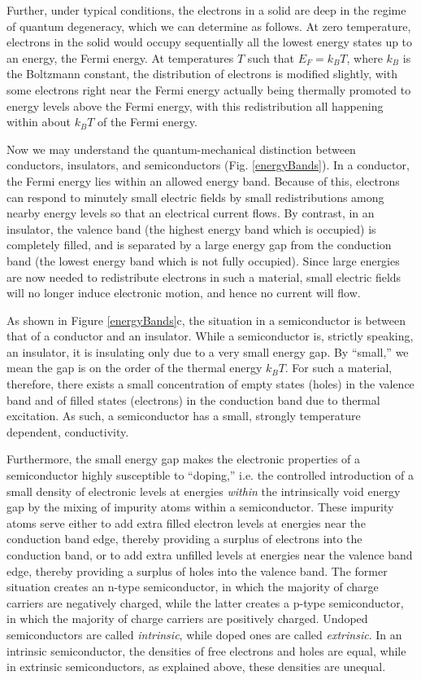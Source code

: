 \documentclass{../lab}
\begin{document}
Further, under typical conditions, the electrons in a solid are deep in the regime of quantum degeneracy, which we can determine as follows. At zero temperature, electrons in the solid would occupy sequentially all the lowest energy states up to an energy, the Fermi energy. At temperatures $T$ such that $E_F = k_B T$, where $k_B$ is the Boltzmann constant, the distribution of electrons is modified slightly, with some electrons right near the Fermi energy actually being thermally promoted to energy levels above the Fermi energy, with this redistribution all happening within about $k_B T$ of the Fermi energy.

Now we may understand the quantum-mechanical distinction between conductors, insulators, and semiconductors (Fig. \ref{energyBands}). In a conductor, the Fermi energy lies within an allowed energy band. Because of this, electrons can respond to minutely small electric fields by small redistributions among nearby energy levels so that an electrical current flows. By contrast, in an insulator, the valence band (the highest energy band which is occupied) is completely filled, and is separated by a large energy gap from the conduction band (the lowest energy band which is not fully occupied). Since large energies are now needed to redistribute electrons in such a material, small electric fields will no longer induce electronic motion, and hence no current will flow.

As shown in Figure \ref{energyBands}c, the situation in a semiconductor is between that of a conductor and an insulator. While a semiconductor is, strictly speaking, an insulator, it is insulating only due to a very small energy gap. By ``small,'' we mean the gap is on the order of the thermal energy $k_B T$. For such a material, therefore, there exists a small concentration of empty states (holes) in the valence band and of filled states (electrons) in the conduction band due to thermal excitation. As such, a semiconductor has a small, strongly temperature dependent, conductivity.

Furthermore, the small energy gap makes the electronic properties of a semiconductor highly susceptible to ``doping,'' i.e. the controlled introduction of a small density of electronic levels at energies \emph{within} the intrinsically void energy gap by the mixing of impurity atoms within a semiconductor. These impurity atoms serve either to add extra filled electron levels at energies near the conduction band edge, thereby providing a surplus of electrons into the conduction band, or to add extra unfilled levels at energies near the valence band edge, thereby providing a surplus of holes into the valence band. The former situation creates an n-type semiconductor, in which the majority of charge carriers are negatively charged, while the latter creates a p-type semiconductor, in which the majority of charge carriers are positively charged. Undoped semiconductors are called \emph{intrinsic}, while doped ones are called \emph{extrinsic}. In an intrinsic semiconductor, the densities of free electrons and holes are equal, while in extrinsic semiconductors, as explained above, these densities are unequal.
\end{document}
